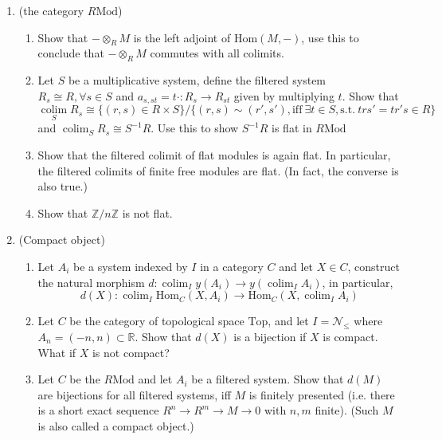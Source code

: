 \documentclass[a4paper,11pt]{article}
\def\bb#1{\mathbb{#1}}
\def\bZ{\mathbb{Z}}
\def\Zmd#1{\bZ/#1\bZ}
\def\mrm#1{\mathrm{#1}}
\def\Hom{\mathrm{Hom}}
\def\Mod#1{#1\mathrm{Mod}}
\DeclareMathOperator{\colim}{colim}
\begin{document}
\begin{enumerate}[1.]
\item (the category $\Mod{R}$)
\begin{enumerate}
    \item Show that $-\otimes_R M$ is the left adjoint of $\Hom(M,-)$, use this to conclude that $-\otimes_R M$ commutes with all colimits.
    \item Let $S$ be a multiplicative system, define the filtered system $R_s\cong R, \forall s\in S$ and $a_{s,st}= t\cdot : R_s\to R_{st}$ given by multiplying $t$. Show that 
    \small
    \[\underset{S}{\colim} R_s \cong \{(r,s)\in R\times S\}/\{(r,s)\sim (r',s'),  \mrm{iff}\ \exists t\in S, \mrm{s.t.}\  trs'= tr's\in R \}\]
    and $\colim_S R_s \cong S^{-1}R$. Use this to show $S^{-1}R$ is flat in $\Mod{R}$
    \item Show that the filtered colimit of flat modules is again flat. In particular, the filtered colimits of finite free modules are flat. (In fact, the converse is also true.)
    \item Show that $\Zmd{n}$ is not flat.
\end{enumerate}
\item (Compact object)
\begin{enumerate}
    \item Let $A_i$ be a system indexed by $I$ in a category $C$ and let $X\in C$, construct the natural morphism $d: \colim_I y(A_i)\to  y( \colim_I A_i) $, in particular, \[d(X):\colim_I\Hom_C(X,A_i) \to \Hom_C(X,\colim_I A_i) \]
    \item Let $C$ be the category of topological space $\mrm{Top}$, and let $I=\mathcal{N}_{\leq}$ where $A_n=(-n,n) \subset  \bb{R}$. Show that $d(X)$ is a bijection if $X$ is compact. What if $X$ is not compact?
    \item Let $C$ be the $\Mod{R}$ and let $A_i$ be a filtered system. Show that $d(M)$ are bijections for all filtered systems, iff $M$ is finitely presented (i.e. there is a short exact sequence $R^n\to R^m\to M\to 0$ with $n,m$ finite). (Such $M$ is also called a compact object.)
\end{enumerate}


\end{enumerate}
\end{document}
